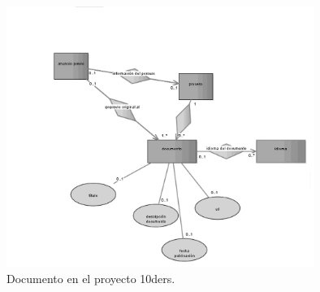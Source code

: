 \begin{figure}[!htb]
\centering
	\includegraphics[width=10cm]{images/phd/eproc/10ders-7}
\caption{Documento en el proyecto 10ders.}
\label{fig:10ders-7}
\end{figure}


% 


% 










